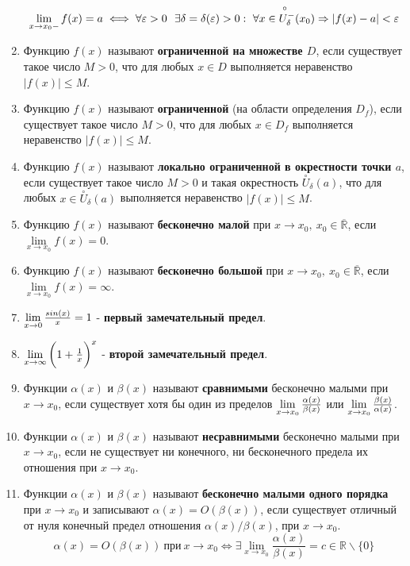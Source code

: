 \begin{enumerate}
$$\lim\limits_{x \to x_0 -} f(x) = a \iff \forall{\large\varepsilon} > 0 \ \ \exists \delta = \delta({\large\varepsilon}) > 0 : \ \forall x \in {\overset{\circ\hspace{22pt}}{U^-_\delta(x_0)}}  \Rightarrow | f(x) - a|  < {\large\varepsilon}$$
\item Функцию $f(x)$ называют \textbf{ограниченной на множестве $D$}, если существует такое число $M > 0$, что для любых $x \in D$ выполняется неравенство $\mid  f(x)\mid   \leqslant M$.
\item Функцию $f(x)$ называют \textbf{ограниченной} (на области определения $D_f$), если существует такое число $M > 0$, что для любых $x \in D_f$ выполняется неравенство $\mid  f(x)\mid   \leqslant M$.
\item Функцию $f(x)$ называют \textbf{локально ограниченной в окрестности точки $a$}, если существует такое число $M > 0$ и такая окрестность $\overset{\circ}U_\delta(a)$, что для любых $x \in \overset{\circ}U_\delta(a)$ выполняется неравенство $\mid  f(x)\mid   \leqslant M$.
\item Функцию $f(x)$ называют \textbf{бесконечно малой} при $x \rightarrow x_0, \ x_0 \in \overline{\mathbb{R}}$, если $\lim\limits_{x \to x_0} f(x) = 0$.
\item Функцию $f(x)$ называют \textbf{бесконечно большой} при $x \rightarrow x_0, \ x_0 \in \overline{\mathbb{R}}$, если $\lim\limits_{x \to x_0} f(x) = \infty$.
\item $\lim\limits_{x \to 0} {\Large\frac{sin(x)}{x}} = 1$ - \textbf{первый замечательный предел}.
\item $\lim\limits_{x \to \infty} \bigg(1 + {\Large\frac{1}{x}}\bigg)^{\large x}$ - \textbf{второй замечательный предел}.
\item Функции $\alpha(x)$ и $\beta(x)$ называют \textbf{сравнимыми} бесконечно малыми при $x \rightarrow x_0$, если существует хотя бы один из пределов $\lim\limits_{x \to x_0} {\large \frac{\alpha(x)}{\beta(x)}}$ или $\lim\limits_{x \to x_0} {\large \frac{\beta(x)}{\alpha(x)}}$.
\item Функции $\alpha(x)$ и $\beta(x)$ называют \textbf{несравнимыми} бесконечно малыми при $x \rightarrow x_0$, если не существует ни конечного, ни бесконечного предела их отношения при $x \rightarrow x_0$.
\item Функции $\alpha(x)$ и $\beta(x)$ называют \textbf{бесконечно малыми одного порядка} при $x \rightarrow x_0$ и записывают $\alpha(x) = O(\beta(x))$, если существует отличный от нуля конечный предел отношения $\alpha(x)/\beta(x)$, при $x \rightarrow x_0$. $$\alpha(x) = O(\beta(x)) \ \text{при} \ x \rightarrow x_0 \iff \exists \lim\limits_{x \to x_0} {\frac{\alpha(x)}{\beta(x)}} = c \in \mathbb{R} \backslash \{0\}$$

\end{enumerate}
